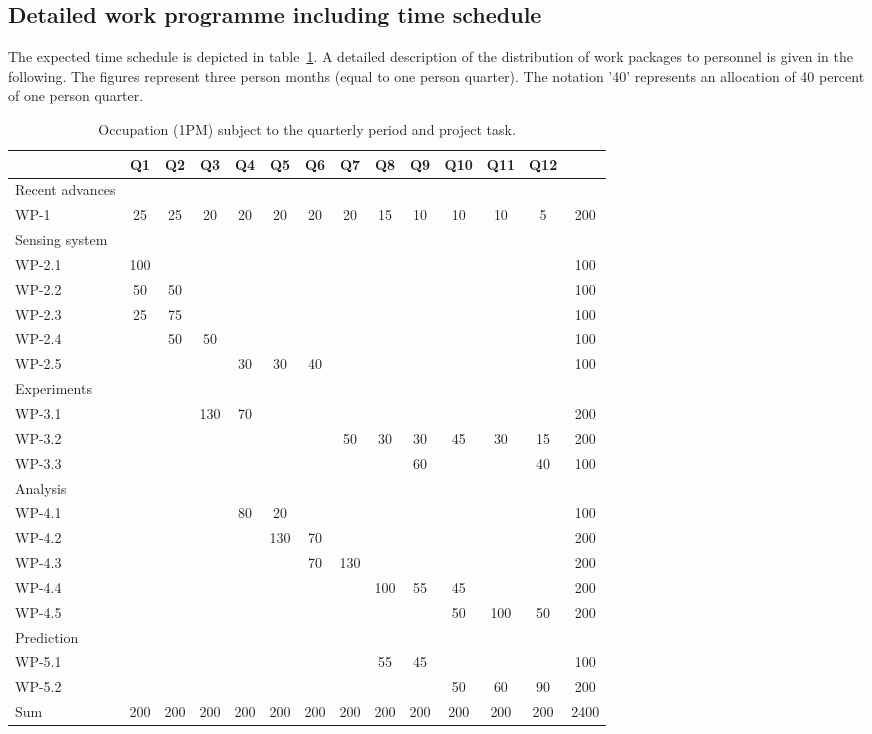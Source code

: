 \documentclass[12pt]{article}
\begin{document}
\subsection*{Detailed work programme including time schedule}
The expected time schedule is depicted in table~\ref{tableGesamtueberblick}. 
A detailed description of the distribution of work packages to personnel is given in the following.
The figures represent three person months (equal to one person quarter).
The notation '40' represents an allocation of 40 percent of one person quarter. 

\begin{table}[h]
\centering
\begin{footnotesize}
\begin{tabular}{|l||c|c|c|c|c|c|c|c|c|c|c|c||c|}
 \hline
	& Q1	&Q2	&Q3	&Q4	&Q5	&Q6	&Q7	&Q8	&Q9	&Q10	&Q11	&Q12	&\\\hline\hline
Recent advances& &	&	&	&	&	&	&	&	&	&	& 	&\\
WP-1	&25	&25	&20	&20	&20	&20	&20	&15	&10	&10	&10	&5 	& 200\\\hline
Sensing system& &	&	&	&	&	&	&	&	&	&	& 	&\\
WP-2.1	&100	&	&	&	&	&	&	&	&	&	&	& 	& 100\\
WP-2.2	&50	&50	&	&	&	&	&	&	&	&	&	& 	& 100\\
WP-2.3	&25	&75	&	&	&	&	&	&	&	&	&	& 	& 100\\
WP-2.4	&	&50	&50	&	&	&	&	&	&	&	&	& 	& 100\\
WP-2.5	&	&	&	&30	&30	&40	&	&	&	&	&	& 	& 100\\\hline
Experiments& &	&	&	&	&	&	&	&	&	&	&	&\\
WP-3.1	&	&	&130	&70	&	&	&	&	&	&	&	& 	& 200\\
WP-3.2	&	&	&	&	&	&	&50	&30	&30	&45	&30	&15 	& 200\\
WP-3.3	&	&	&	&	&	&	&	&	&60	&	&	&40 	& 100\\\hline
Analysis& &	&	&	&	&	&	&	&	&	&	& 	&\\
WP-4.1	&	&	&	&80	&20	&	&	&	&	&	&	& 	& 100\\
WP-4.2	&	&	&	&	&130	&70	&	&	&	&	&	& 	& 200\\
WP-4.3	&	&	&	&	&	&70	&130	&	&	&	&	& 	& 200\\
WP-4.4	&	&	&	&	&	&	&	&100	&55	&45	&	& 	& 200\\
WP-4.5	&	&	&	&	&	&	&	&	&	&50	&100	&50 	& 200\\\hline
Prediction& &	&	&	&	&	&	&	&	&	&	& &\\
WP-5.1	&	&	&	&	&	&	&	&55	 &45	&	&	&	& 100\\%
WP-5.2	&	&	&	&	&	&	&	&	 &	&50	&60	&90	& 200\\\hline
Sum	& 200	&200	&200	&200	&200	&200	&200	&200	 &200	&200	&200	&200	& 2400\\\hline
\end{tabular}
\end{footnotesize}
\caption{Occupation (1PM) subject to the quarterly period and project task.}
\label{tableGesamtueberblick}
\end{table}
\end{document}
